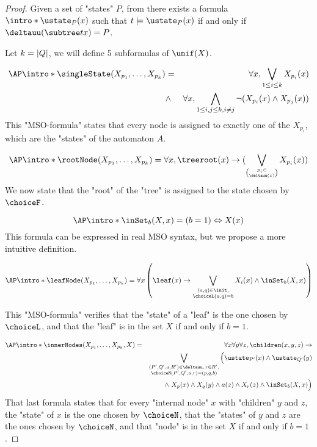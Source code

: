 \documentclass[a4paper,UKenglish,cleveref, autoref, thm-restate]{lipics-v2021}
\begin{document}
\begin{proof}
	\AP Given a set of "states" $P$, from  there exists a formula $\intro* \ustate_P(x)$ such that
	$t \models \ustate_P(x)$ if and only if  $\deltauu(\subtree t x) = P$.

	Let $k = \left|Q\right|$, we will define 5 subformulas of $\unif(X)$.

	\begin{eqnarray*}
		\AP \intro* \singleState (X_{p_1}, \ldots, X_{p_k})  &=& \forall x, \bigvee_{1 \leq i \leq k} X_{p_i} (x)\\
		&\land& \forall x, \bigwedge_{1 \leq i, j \leq k, i \neq j} \lnot(X_{p_i} (x) \land X_{p_j}(x))
	\end{eqnarray*}
	This "MSO-formula" states that every node is assigned to exactly one of the $X_{p_i}$, which are the "states" of the automaton $A$.

	\begin{equation*}
		\AP \intro*	\rootNode (X_{p_1}, \ldots, X_{p_k})  = \forall x, \treeroot(x) \ra (\bigvee_{p_i \in \choose \deltauu(\varepsilon)} X_{p_i}(x))
	\end{equation*}
	We now state that the "root" of the "tree" is assigned to the state chosen by $\choiceF$.

	\begin{equation*}
		\AP \intro* \inSet_b (X, x)  = (b = 1) \Leftrightarrow X(x)
	\end{equation*}
	This formula can be expressed in real MSO syntax, but we propose a more intuitive definition.

	\begin{equation*}
		\AP \intro* \leafNode (X_{p_1}, \ldots, X_{p_k})  = \forall x \left( \leaf(x) \rightarrow \bigvee_{\substack{(a, q) \in \init,\\ \choiceL(a,q) = b}} X_i(x) \land  \inSet_b (X,x)  \right)
	\end{equation*}

	This "MSO-formula" verifies that the "state" of a "leaf" is the one chosen by $\choiceL$, and that the "leaf" is in the set $X$ if and only if $b = 1$.

	\begin{eqnarray*}
		\AP \intro* \innerNodes (X_{p_1}, \ldots, X_{p_k}, X)  &=& \forall x \forall y \forall z, \children (x,y,z) \ra \\
		&& \bigvee_{ \substack{(P',Q',a,R')\in \deltauu, \, r \in R', \\ \choiceN(P',Q',a,r) = (p,q,b)}} \Big( \ustate_{P'}(x) \land \ustate_{Q'}(y) \\
		&& \qquad \land \  X_p(x) \land X_q(y) \land a(z) \land X_r(z) \land  \inSet_b(X,x)\Big)
	\end{eqnarray*}
	That last formula states that for every "internal node" $x$ with "children" $y$ and $z$, the "state" of $x$ is the one chosen by $\choiceN$,
	that the "states" of $y$ and $z$ are the ones chosen by $\choiceN$, and that "node" is in the set $X$ if and only if $b = 1$.



\end{proof}
\end{document}
